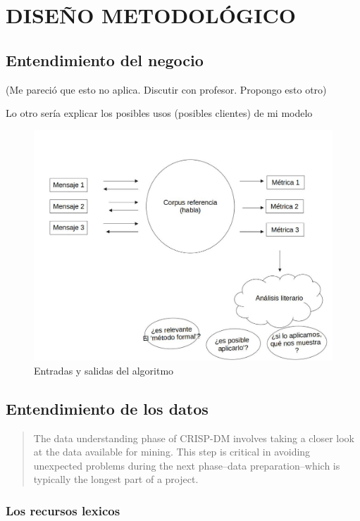 \documentclass[twoside]{article}
\begin{document}
\section{DISEÑO METODOLÓGICO}
\label{sec:org139deab}
\subsection{Entendimiento del negocio}
\label{sec:org7c54a77}
(Me pareció que esto no aplica. Discutir con profesor. Propongo esto otro)

Lo otro sería explicar los posibles usos (posibles clientes) de mi modelo
\begin{figure}[htbp]
\centering
\includegraphics[width=.9\linewidth]{./assets/posibles_usos.jpg}
\caption{Entradas y salidas del algoritmo}
\end{figure}

\subsection{Entendimiento de los datos}
\label{sec:orgc975bf0}

\begin{quote}
The data understanding phase of CRISP-DM involves taking a closer
look at the data available for mining. This step is critical in
avoiding unexpected problems during the next phase--data
preparation--which is typically the longest part of a project.
\end{quote}

\subsubsection{Los recursos lexicos}
\label{sec:org697241f}
\end{document}
